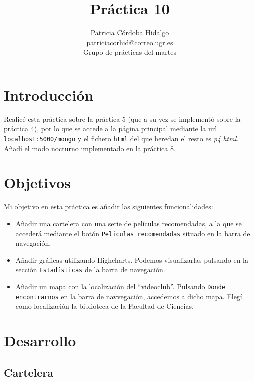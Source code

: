 \documentclass{article}
\begin{document}
\title{\Huge Práctica 10}
\author{\LARGE Patricia Córdoba Hidalgo \vspace{2mm}\\
  \Large patriciacorhid@correo.ugr.es \vspace{2mm}\\
  \Large Grupo de prácticas del  martes \vspace{5mm}}
\date{}
\maketitle

\section{Introducción}

Realicé esta práctica sobre la práctica 5 (que a su vez se implementó sobre la práctica 4), por lo que se accede a la página principal mediante la url \texttt{localhost:5000/mongo} y el fichero \texttt{html} del que heredan el resto es \textit{p4.html}. Añadí el modo nocturno implementado en la práctica 8.

\section{Objetivos}

Mi objetivo en esta práctica es añadir las siguientes funcionalidades:
\begin{itemize}
\item Añadir una cartelera con una serie de películas recomendadas, a la que se accederá mediante el botón \texttt{Peliculas recomendadas} situado en la barra de navegación.
\item Añadir gráficas utilizando Highcharts. Podemos visualizarlas pulsando en la sección \texttt{Estadísticas} de la barra de navegación.
\item Añadir un mapa con la localización del ``videoclub''. Pulsando \texttt{Donde encontrarnos} en la barra de navvegación, accedemos a dicho mapa. Elegí como localización la biblioteca de la Facultad de Ciencias.
\end{itemize}

\section{Desarrollo}

\subsection{Cartelera}
\end{document}
